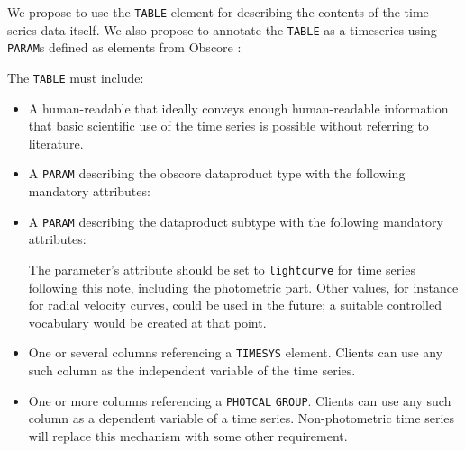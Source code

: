 \documentclass[11pt,a4paper]{ivoa} 
\let\fg=\color
\def\elem#1{{\tt{\fg{DarkRed}#1}}}
\def\attrval#1#2{{\tt{\fg{DarkRed}#1}="{\fg{DarkPurple}#2}"}}
\begin{document}
We propose to use the \elem{TABLE} element for describing the contents
of the time series data itself. 
We also propose to annotate the \elem{TABLE} as a timeseries using
\elem{PARAM}s defined as elements from Obscore
\citep{2017ivoa.spec.0509L}:

The \elem{TABLE} must include:

\begin{itemize}
\item A human-readable  that ideally conveys enough
  human-readable information that basic scientific use of the time
  series is possible without referring to literature.

\item A \elem{PARAM} describing the obscore dataproduct type with the
  following mandatory attributes:

\item A \elem{PARAM} describing the dataproduct subtype with the
  following mandatory attributes:


The parameter's  attribute should be set to
\texttt{lightcurve} for time series following this note, including the
photometric part.  Other values, for instance for radial velocity
curves, could be used in the future; a suitable controlled vocabulary
would be created at that point.

     \item One or several columns referencing a \elem{TIMESYS}
       element.  Clients can use any such column as the independent
       variable of the time series.

     \item One or more columns referencing a \texttt{PHOTCAL}
       \elem{GROUP}.  Clients can use any such column as a dependent
       variable of a time series.  Non-photometric time series will
       replace this mechanism with some other requirement.
\end{itemize}
\end{document}
